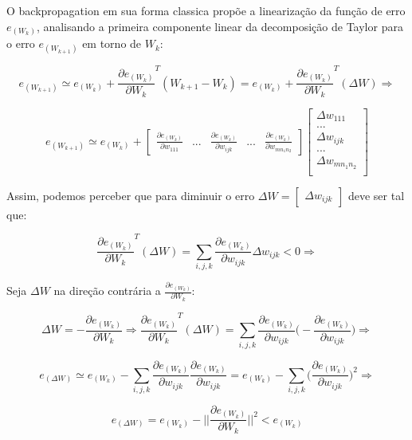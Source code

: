 \documentclass[
	12pt,				%
	oneside,			%
	a4paper,			%
	english,			%
	french,				%
	spanish,			%
	brazil,				%
	]{abntex2}
\begin{document}
O backpropagation em sua forma classica prop\~oe a lineariza\c{c}\~ao da fun\c{c}\~ao de erro $e_{(W_k)}$, analisando a primeira componente linear da decomposi\c{c}\~ao de Taylor para o erro $e_{(W_{k+1})}$ em torno de $W_{k}$:

$$e_{(W_{k+1})} \simeq e_{(W_{k})} + \frac{ \partial e_{(W_{k})} } { \partial W_k }^T (W_{k+1} - W_k)
= e_{(W_{k})} + \frac{ \partial e_{(W_{k})} } { \partial W_k }^T(\Delta W) \Rightarrow$$

$$e_{(W_{k+1})} \simeq e_{(W_{k})} + \begin{bmatrix}
\frac{ \partial e_{(W_{k})} } { \partial w_{111} } & ...
& \frac{ \partial e_{(W_{k})} } { \partial w_{ijk} } & ... & \frac{ \partial e_{(W_{k})} } { \partial w_{mn_1n_2} }

\end{bmatrix} \begin{bmatrix}
\Delta w_{111} \\
... \\
\Delta w_{ijk} \\
... \\
\Delta w_{mn_1n_2} \\

\end{bmatrix} $$

Assim, podemos perceber que para diminuir o erro $\Delta W = \begin{bmatrix}
\Delta w_{ijk}
\end{bmatrix}$ deve ser tal que:

$$ \frac{ \partial e_{(W_{k})} } { \partial W_k }^T(\Delta W) = \sum_{i,j,k} \frac{ \partial e_{(W_{k})} } { \partial w_{ijk} } \Delta w_{ijk} < 0  \Rightarrow $$

Seja $\Delta W$ na dire\c{c}\~ao contr\'aria a $ \frac{ \partial e_{(W_{k})} } { \partial W_k }$:

$$\Delta W = -  \frac{ \partial e_{(W_{k})} } { \partial W_k } \Rightarrow 
\frac{ \partial e_{(W_{k})} } { \partial W_k }^T(\Delta W) = 
\sum_{i,j,k} \frac{ \partial e_{(W_{k})} } { \partial w_{ijk} } \Big( - \frac{ \partial e_{(W_{k})} } { \partial w_{ijk} } \Big ) \Rightarrow $$

$$ e_{(\Delta W)} \simeq e_{(W_k)}
- \sum_{i,j,k} \frac{ \partial e_{(W_{k})} } { \partial w_{ijk} } \frac{ \partial e_{(W_{k})} } { \partial w_{ijk} }
=
e_{(W_k)}
- \sum_{i,j,k} \Big( \frac{ \partial e_{(W_{k})} } { \partial w_{ijk} } \Big)^2 \Rightarrow
$$

$$e_{(\Delta W)} = e_{(W_k)}
- \bigg|\bigg|  \frac{ \partial e_{(W_{k})} } { \partial W_k } \bigg|\bigg|^2 < e_{(W_k)}$$
\end{document}
